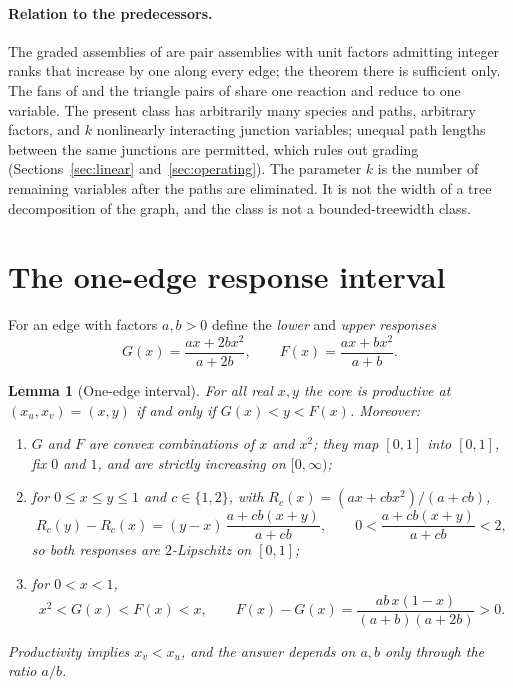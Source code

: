 \documentclass[11pt,a4paper]{article}
\theoremstyle{plain}
\newtheorem{lemma}[theorem]{Lemma}
\theoremstyle{definition}
\theoremstyle{remark}
\begin{document}
\paragraph{Relation to the predecessors.} The graded assemblies of \citep{tcch2026} are pair assemblies with unit factors admitting integer ranks that increase by one along every edge; the theorem there is sufficient only. The fans of \citep{tcch2026} and the triangle pairs of \citep{tcic2026} share one reaction and reduce to one variable. The present class has arbitrarily many species and paths, arbitrary factors, and $k$ nonlinearly interacting junction variables; unequal path lengths between the same junctions are permitted, which rules out grading (Sections~\ref{sec:linear} and~\ref{sec:operating}). The parameter $k$ is the number of remaining variables after the paths are eliminated. It is not the width of a tree decomposition of the graph, and the class is not a bounded-treewidth class.

\section{The one-edge response interval}\label{sec:edge}

For an edge with factors $a,b>0$ define the \emph{lower} and \emph{upper responses}
\begin{equation}\label{eq:responses}
  G(x)=\frac{ax+2bx^2}{a+2b},\qquad F(x)=\frac{ax+bx^2}{a+b}.
\end{equation}

\begin{lemma}[One-edge interval]\label{lem:edge}
For all real $x,y$ the core is productive at $(x_u,x_v)=(x,y)$ if and only if $G(x)<y<F(x)$. Moreover:
\begin{enumerate}[label=(\alph*)]
\item $G$ and $F$ are convex combinations of $x$ and $x^2$; they map $[0,1]$ into $[0,1]$, fix $0$ and $1$, and are strictly increasing on $[0,\infty)$;
\item for $0\le x\le y\le1$ and $c\in\{1,2\}$, with $R_c(x)=(ax+cbx^2)/(a+cb)$,
\begin{equation}\label{eq:finitediff}
  R_c(y)-R_c(x)=(y-x)\,\frac{a+cb(x+y)}{a+cb},\qquad 0<\frac{a+cb(x+y)}{a+cb}<2,
\end{equation}
so both responses are $2$-Lipschitz on $[0,1]$;
\item for $0<x<1$,
\begin{equation}\label{eq:gap}
  x^2<G(x)<F(x)<x,\qquad F(x)-G(x)=\frac{ab\,x(1-x)}{(a+b)(a+2b)}>0 .
\end{equation}
\end{enumerate}
Productivity implies $x_v<x_u$, and the answer depends on $a,b$ only through the ratio $a/b$.
\end{lemma}
\end{document}
